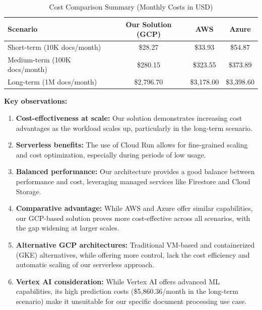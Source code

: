 \documentclass[a4paper, 12pt]{report}
\begin{document}
\begin{table}[h]
\centering
\caption{Cost Comparison Summary (Monthly Costs in USD)}
\begin{tabular}{|l|c|c|c|}
\hline
\textbf{Scenario} & \textbf{Our Solution (GCP)} & \textbf{AWS} & \textbf{Azure} \\
\hline
Short-term (10K docs/month) & \$28.27 & \$33.93 & \$54.87 \\
Medium-term (100K docs/month) & \$280.15 & \$323.55 & \$373.89 \\
Long-term (1M docs/month) & \$2,796.70 & \$3,178.00 & \$3,398.60 \\
\hline
\end{tabular}
\end{table}

\textbf{Key observations:}

\begin{enumerate}
    \item \textbf{Cost-effectiveness at scale:} Our solution demonstrates increasing cost advantages as the workload scales up, particularly in the long-term scenario.

    \item \textbf{Serverless benefits:} The use of Cloud Run allows for fine-grained scaling and cost optimization, especially during periods of low usage.
    
    \item \textbf{Balanced performance:} Our architecture provides a good balance between performance and cost, leveraging managed services like Firestore and Cloud Storage.
    
    \item \textbf{Comparative advantage:} While AWS and Azure offer similar capabilities, our GCP-based solution proves more cost-effective across all scenarios, with the gap widening at larger scales.
    
    \item \textbf{Alternative GCP architectures:} Traditional VM-based and containerized (GKE) alternatives, while offering more control, lack the cost efficiency and automatic scaling of our serverless approach.
    
    \item \textbf{Vertex AI consideration:} While Vertex AI offers advanced ML capabilities, its high prediction costs (\$5,860.36/month in the long-term scenario) make it unsuitable for our specific document processing use case.
\end{enumerate}
\end{document}
